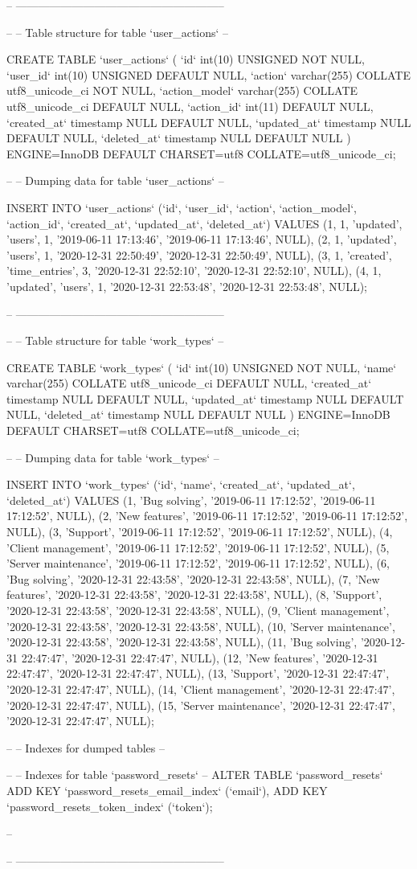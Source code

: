 \documentclass{article}
\begin{document}
-- --------------------------------------------------------

--
-- Table structure for table `user_actions`
--

CREATE TABLE `user_actions` (
  `id` int(10) UNSIGNED NOT NULL,
  `user_id` int(10) UNSIGNED DEFAULT NULL,
  `action` varchar(255) COLLATE utf8_unicode_ci NOT NULL,
  `action_model` varchar(255) COLLATE utf8_unicode_ci DEFAULT NULL,
  `action_id` int(11) DEFAULT NULL,
  `created_at` timestamp NULL DEFAULT NULL,
  `updated_at` timestamp NULL DEFAULT NULL,
  `deleted_at` timestamp NULL DEFAULT NULL
) ENGINE=InnoDB DEFAULT CHARSET=utf8 COLLATE=utf8_unicode_ci;

--
-- Dumping data for table `user_actions`
--

INSERT INTO `user_actions` (`id`, `user_id`, `action`, `action_model`, `action_id`, `created_at`, `updated_at`, `deleted_at`) VALUES
(1, 1, 'updated', 'users', 1, '2019-06-11 17:13:46', '2019-06-11 17:13:46', NULL),
(2, 1, 'updated', 'users', 1, '2020-12-31 22:50:49', '2020-12-31 22:50:49', NULL),
(3, 1, 'created', 'time_entries', 3, '2020-12-31 22:52:10', '2020-12-31 22:52:10', NULL),
(4, 1, 'updated', 'users', 1, '2020-12-31 22:53:48', '2020-12-31 22:53:48', NULL);

-- --------------------------------------------------------

--
-- Table structure for table `work_types`
--

CREATE TABLE `work_types` (
  `id` int(10) UNSIGNED NOT NULL,
  `name` varchar(255) COLLATE utf8_unicode_ci DEFAULT NULL,
  `created_at` timestamp NULL DEFAULT NULL,
  `updated_at` timestamp NULL DEFAULT NULL,
  `deleted_at` timestamp NULL DEFAULT NULL
) ENGINE=InnoDB DEFAULT CHARSET=utf8 COLLATE=utf8_unicode_ci;

--
-- Dumping data for table `work_types`
--

INSERT INTO `work_types` (`id`, `name`, `created_at`, `updated_at`, `deleted_at`) VALUES
(1, 'Bug solving', '2019-06-11 17:12:52', '2019-06-11 17:12:52', NULL),
(2, 'New features', '2019-06-11 17:12:52', '2019-06-11 17:12:52', NULL),
(3, 'Support', '2019-06-11 17:12:52', '2019-06-11 17:12:52', NULL),
(4, 'Client management', '2019-06-11 17:12:52', '2019-06-11 17:12:52', NULL),
(5, 'Server maintenance', '2019-06-11 17:12:52', '2019-06-11 17:12:52', NULL),
(6, 'Bug solving', '2020-12-31 22:43:58', '2020-12-31 22:43:58', NULL),
(7, 'New features', '2020-12-31 22:43:58', '2020-12-31 22:43:58', NULL),
(8, 'Support', '2020-12-31 22:43:58', '2020-12-31 22:43:58', NULL),
(9, 'Client management', '2020-12-31 22:43:58', '2020-12-31 22:43:58', NULL),
(10, 'Server maintenance', '2020-12-31 22:43:58', '2020-12-31 22:43:58', NULL),
(11, 'Bug solving', '2020-12-31 22:47:47', '2020-12-31 22:47:47', NULL),
(12, 'New features', '2020-12-31 22:47:47', '2020-12-31 22:47:47', NULL),
(13, 'Support', '2020-12-31 22:47:47', '2020-12-31 22:47:47', NULL),
(14, 'Client management', '2020-12-31 22:47:47', '2020-12-31 22:47:47', NULL),
(15, 'Server maintenance', '2020-12-31 22:47:47', '2020-12-31 22:47:47', NULL);

--
-- Indexes for dumped tables
--

--
-- Indexes for table `password_resets`
--
ALTER TABLE `password_resets`
  ADD KEY `password_resets_email_index` (`email`),
  ADD KEY `password_resets_token_index` (`token`);

--

-- --------------------------------------------------------
\end{document}
